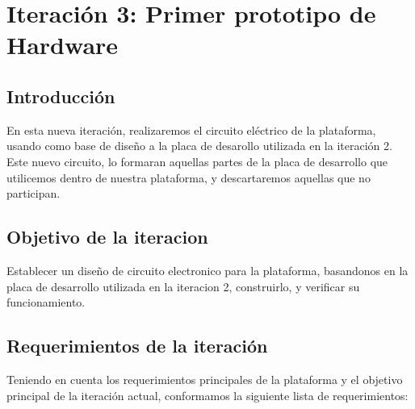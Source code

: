 \chapter{Iteración 3: Primer prototipo de Hardware} %
\label{cha:iteracion_3}


\section{Introducción} %
\label{it3:sec:introduccion}

En esta nueva iteración, realizaremos el circuito eléctrico de la plataforma, usando como base de diseño a la placa de desarollo utilizada en la iteración 2. Este nuevo circuito, lo formaran aquellas partes de la placa de desarrollo que utilicemos dentro de nuestra plataforma, y descartaremos aquellas que no participan.




\section{Objetivo de la iteracion}

Establecer un diseño de circuito electronico para la plataforma, basandonos en la placa de desarrollo utilizada en la iteracion 2, construirlo, y verificar su funcionamiento.

\section{Requerimientos de la iteración} %
\label{it3:sec:requerimientos_de_la_iteracion}

Teniendo en cuenta los requerimientos principales de la plataforma y el objetivo principal de la iteración actual, conformamos la siguiente lista de requerimientos:

